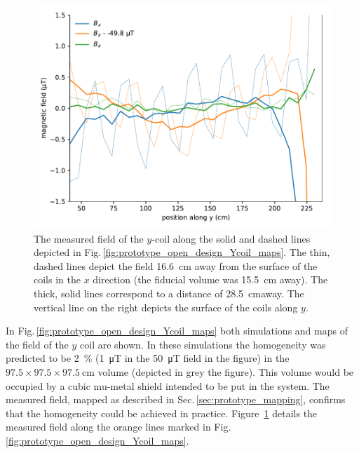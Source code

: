 \begin{figure}
  \centering
  \includegraphics[width=\linewidth]{gfx/prototype/open_planar_map_Y_By_section.pdf}
  \caption{The measured field of the $y$-coil along the solid and dashed lines depicted in Fig.\,\ref{fig:prototype_open_design_Ycoil_maps}. The thin, dashed lines depict the field \SI{16.6}{\centi\metre} away from the surface of the coils in the $x$ direction (the fiducial volume was \SI{15.5}{\centi\metre} away). The thick, solid lines correspond to a distance of \SI{28.5}{\centi\metre}away. The vertical line on the right depicts the surface of the coils along $y$.}\label{fig:prototype_open_design_Ycoil_map_section}
\end{figure}

In Fig.\,\ref{fig:prototype_open_design_Ycoil_maps} both simulations and maps of the field of the $y$ coil are shown.
In these simulations the homogeneity was predicted to be \SI{2}{\percent} (\SI{1}{\micro\tesla} in the \SI{50}{\micro\tesla} field in the figure) in the $97.5 \times 97.5 \times \SI{97.5}{\centi\metre}$ volume (depicted in grey the figure).
This volume would be occupied by a cubic mu-metal shield intended to be put in the system.
The measured field, mapped as described in Sec.\,\ref{sec:prototype_mapping}, confirms that the homogeneity could be achieved in practice.
Figure~\ref{fig:prototype_open_design_Ycoil_map_section} details the measured field along the orange lines marked in Fig.\,\ref{fig:prototype_open_design_Ycoil_maps}.

